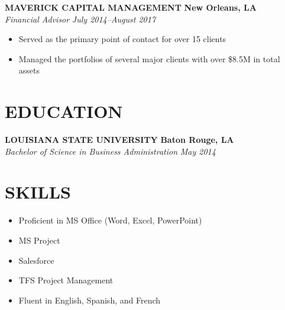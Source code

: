 \documentclass[11pt,letterpaper]{article}
\newcommand{\role}[4]{
  \begin{center}
  \textbf{#1} \hfill \textbf{#2} \\
  \textit{#3} \hfill \textit{#4}
  \end{center}
}
\begin{document}
\role{MAVERICK CAPITAL MANAGEMENT}{New Orleans, LA}{Financial Advisor}{July 2014--August 2017}
\begin{itemize}[leftmargin=*,nosep,topsep=0pt]
  \item Served as the primary point of contact for over 15 clients
  \item Managed the portfolios of several major clients with over \$8.5M in total assets
\end{itemize}

\vspace{1em}
\section{EDUCATION}

\vspace{0.5em}
\role{LOUISIANA STATE UNIVERSITY}{Baton Rouge, LA}{Bachelor of Science in Business Administration}{May 2014}

\vspace{1em}
\section{SKILLS}

\vspace{0.5em}
\begin{itemize}[leftmargin=*,nosep]
  \item Proficient in MS Office (Word, Excel, PowerPoint)
  \item MS Project
  \item Salesforce
  \item TFS Project Management
  \item Fluent in English, Spanish, and French
\end{itemize}
\end{document}
